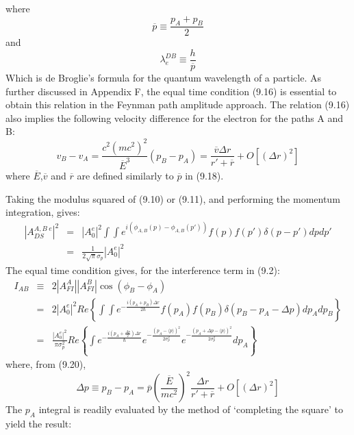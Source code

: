 {\begin{equation}
   \end{equation}
   where 
    \begin{equation}
    \overline{p} \equiv \frac{p_A+p_B}{2}
   \end{equation}  
     and
    \begin{equation} 
     \lambda_e^{DB} \equiv  \frac{h}{\overline{p}}
   \end{equation}
   Which is de Broglie's formula for the quantum wavelength of a particle. As further discussed 
  in Appendix F, the equal time condition (9.16) is essential to obtain this relation
  in the Feynman path amplitude approach. The relation (9.16) also implies the following
  velocity difference for the electron for the paths A and B:
   \begin{equation} 
 v_B -v_A = \frac{c^2(mc^2)^2}{\overline{E}^3}(p_B-p_A)  = \frac{\overline{v} \Delta r}{r'+\overline{r}}
  +O[(\Delta r)^2]
   \end{equation}
 where $\overline{E}$,$\overline{v}$ and $\overline{r}$ are defined similarly to $\overline{p}$ in (9.18).
 \par Taking the modulus squared of (9.10) or (9.11), and performing the momentum integration, gives:
  \begin{eqnarray}
 |A_{DS}^{A,B~e}|^2 & = & |A_0^e|^2 \int \int e^{i(\phi_{A,B}(p)-\phi_{A,B}(p'))}f(p)f(p')\delta(p-p') dp dp'
  \nonumber \\
   & = &  \frac{1}{2 \sqrt{\pi} \sigma_p}|A_0^e|^2
  \end{eqnarray}
   The equal time condition gives, for the interference term in (9.2):
  \begin{eqnarray}
  I_{AB} & \equiv & 2 |A_{FI}^A||A_{FI}^B|\cos(\phi_B-\phi_A)\nonumber \\
  & = & 2 |A_0^e|^2 Re \left\{ \int \int e^{-\frac{i(p_A+p_B)\Delta r}{2 \hbar}}f(p_A)f(p_B)\delta(p_B-p_A-\Delta p)
   dp_A dp_B \right\}\nonumber \\
    & = &  \frac{|A_0^e|^2}{\pi \sigma_p^2} Re  \left\{ \int   e^{-\frac{i(p_A+\frac{\Delta p}{2})\Delta r}{\hbar}}  
    e^{-\frac{(p_A-\langle p \rangle)^2}{2\sigma_p^2}}  e^{-\frac{(p_A+ \Delta p-\langle p \rangle)^2}{2\sigma_p^2}}
     dp_A  \right\}
  \end{eqnarray}
 where, from (9.20),
    \begin{equation}
   \Delta p \equiv p_B-p_A = \overline{p} \left(\frac{\overline{E}}{mc^2}\right)^2\frac{\Delta r}{r'+\overline{r}}
    +O[(\Delta r)^2]
   \end{equation}
 The $p_A$ integral is readily evaluated by the method of `completing the square' to yield the result:
}
